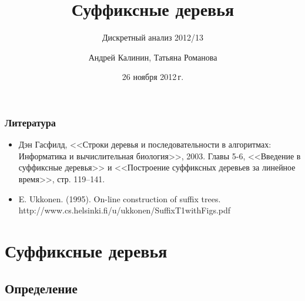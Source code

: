 \documentclass[hyperref={unicode=true}]{beamer}
\title{Суффиксные деревья}
\subtitle{Дискретный анализ 2012/13}
\author{Андрей Калинин, Татьяна Романова}
\date{26 ноября 2012\,г. }
\begin{document}
\frame{\titlepage}

\frame{\tableofcontents}

\frame
{
  \frametitle{Литература}

  \begin{itemize}
  \item Дэн Гасфилд, <<Строки деревья и последовательности в алгоритмах:
    Информатика и вычислительная биология>>, 2003. Главы 5-6,
    <<Введение в суффиксные деревья>> и <<Построение суффиксных
    деревьев за линейное время>>, стр. 119--141.  
  \item E. Ukkonen. (1995). On-line construction of suffix trees.\\ http://www.cs.helsinki.fi/u/ukkonen/SuffixT1withFigs.pdf
  \end{itemize}
}


\section{Суффиксные деревья}

\subsection{Определение}
\end{document}
